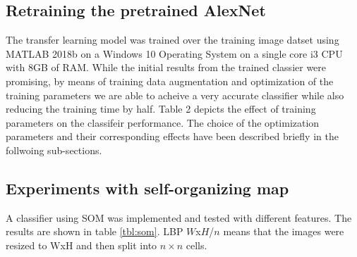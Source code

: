 \documentclass[doc/report.tex]{subfiles}
\begin{document}
\subsection{Retraining the pretrained AlexNet}
The transfer learning model was trained over the training image datset using MATLAB 2018b on a Windows 10 Operating System on a single core i3 CPU with 8GB of RAM. While the initial results from the trained classier were promising, by means of training data augmentation and optimization of the training parameters we are able to acheive a very accurate classifier while also reducing the training time by half. Table 2 depicts the effect of training parameters on the classifeir performance. The choice of the optimization parameters and their corresponding effects have been described briefly in the follwoing sub-sections.

\begin{table}[h]
\centering
\caption{Training Parameter Analysis}
\label{tab:my-table2}
\end{table}

\subsection{Experiments with self-organizing map}
A classifier using SOM was implemented and tested with different features.  The
results are shown in table \ref{tbl:som}. LBP $W$x$H$/$n$ means that the
images were resized to WxH and then split into $n\times n$ cells.
    
\end{document}
